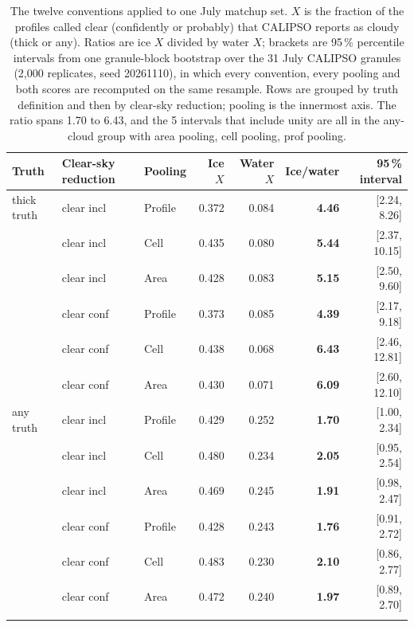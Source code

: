 \begin{table}[!htbp]
\centering
\caption{The twelve conventions applied to one July matchup set. $X$ is the fraction of the profiles called clear (confidently or probably) that CALIPSO reports as cloudy (thick or any). Ratios are ice $X$ divided by water $X$; brackets are 95\,\% percentile intervals from one granule-block bootstrap over the 31 July CALIPSO granules (2{,}000 replicates, seed 20261110), in which every convention, every pooling and both scores are recomputed on the same resample. Rows are grouped by truth definition and then by clear-sky reduction; pooling is the innermost axis. The ratio spans 1.70 to 6.43, and the 5 intervals that include unity are all in the any-cloud group with area pooling, cell pooling, prof pooling.}
\label{tab:conventions}
\small
\begin{tabular}{@{}lllrrrr@{}}
\toprule
Truth & Clear-sky reduction & Pooling & Ice $X$ & Water $X$ & Ice/water & 95\,\% interval \\
\midrule
thick truth & clear incl & Profile & 0.372 & 0.084 & \textbf{4.46} & [2.24, 8.26] \\
 & clear incl & Cell & 0.435 & 0.080 & \textbf{5.44} & [2.37, 10.15] \\
 & clear incl & Area & 0.428 & 0.083 & \textbf{5.15} & [2.50, 9.60] \\
\addlinespace
 & clear conf & Profile & 0.373 & 0.085 & \textbf{4.39} & [2.17, 9.18] \\
 & clear conf & Cell & 0.438 & 0.068 & \textbf{6.43} & [2.46, 12.81] \\
 & clear conf & Area & 0.430 & 0.071 & \textbf{6.09} & [2.60, 12.10] \\
\addlinespace
any truth & clear incl & Profile & 0.429 & 0.252 & \textbf{1.70} & [1.00, 2.34] \\
 & clear incl & Cell & 0.480 & 0.234 & \textbf{2.05} & [0.95, 2.54] \\
 & clear incl & Area & 0.469 & 0.245 & \textbf{1.91} & [0.98, 2.47] \\
\addlinespace
 & clear conf & Profile & 0.428 & 0.243 & \textbf{1.76} & [0.91, 2.72] \\
 & clear conf & Cell & 0.483 & 0.230 & \textbf{2.10} & [0.86, 2.77] \\
 & clear conf & Area & 0.472 & 0.240 & \textbf{1.97} & [0.89, 2.70] \\
\addlinespace
\bottomrule
\end{tabular}
\end{table}
